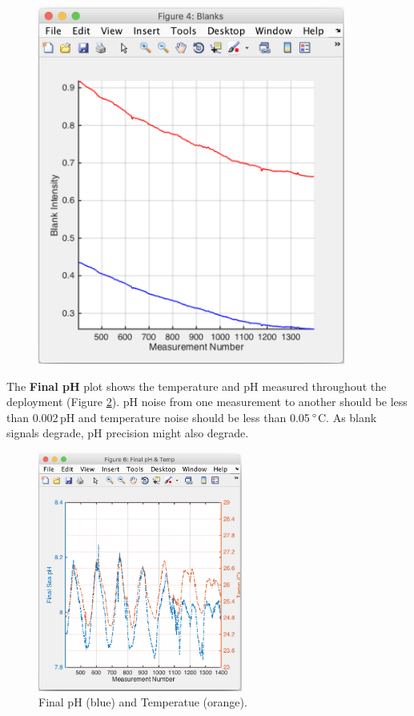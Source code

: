 \begin{figure}[!h]
\begin{minipage}[t]{0.45\textwidth}
\centering
\includegraphics[width=0.9\textwidth]{figs/Blanks.png}
\end{minipage}

\label{fig:Blanks}
\end{figure}

The \textbf{Final pH} plot shows the temperature and pH measured throughout the deployment (Figure \ref{fig:FinalpH}).  pH noise from one measurement to another should be less than 0.002\,pH and temperature noise should be less than 0.05\,$\degree$C.  As blank signals degrade, pH precision might also degrade.

\begin{figure}
\centering\includegraphics[width=0.6\textwidth]{figs/Final_PH.png}
\caption{Final pH (blue) and Temperatue (orange).}
\label{fig:FinalpH}
\end{figure}